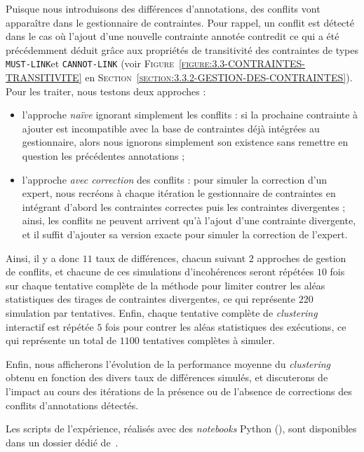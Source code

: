 			Puisque nous introduisons des différences d'annotations, des conflits vont apparaître dans le gestionnaire de contraintes.
			Pour rappel, un conflit est détecté dans le cas où l'ajout d'une nouvelle contrainte annotée contredit ce qui a été précédemment déduit grâce aux propriétés de transitivité des contraintes de types \texttt{MUST-LINK}et \texttt{CANNOT-LINK} (voir \textsc{Figure~\ref{figure:3.3-CONTRAINTES-TRANSITIVITE}} en \textsc{Section~\ref{section:3.3.2-GESTION-DES-CONTRAINTES}}).
			Pour les traiter, nous testons deux approches :
			\begin{itemize}
				\item l'approche \textit{naïve} ignorant simplement les conflits : si la prochaine contrainte à ajouter est incompatible avec la base de contraintes déjà intégrées au gestionnaire, alors nous ignorons simplement son existence sans remettre en question les précédentes annotations ;
				\item l'approche \textit{avec correction} des conflits : pour simuler la correction d'un expert, nous recréons à chaque itération le gestionnaire de contraintes en intégrant d'abord les contraintes correctes puis les contraintes divergentes ; ainsi, les conflits ne peuvent arrivent qu'à l'ajout d'une contrainte divergente, et il suffit d'ajouter sa version exacte pour simuler la correction de l'expert.
			\end{itemize}
			
			Ainsi, il y a donc $11$ taux de différences, chacun suivant $2$ approches de gestion de conflits, et chacune de ces simulations d'incohérences seront répétées $10$ fois sur chaque tentative complète de la méthode pour limiter contrer les aléas statistiques des tirages de contraintes divergentes, ce qui représente $220$ simulation par tentatives.
			Enfin, chaque tentative complète de \textit{clustering} interactif est répétée $5$ fois pour contrer les aléas statistiques des exécutions, ce qui représente un total de $1100$ tentatives complètes à simuler.

			Enfin, nous afficherons l'évolution de la performance moyenne du \textit{clustering} obtenu en fonction des divers taux de différences simulés, et discuterons de l'impact au cours des itérations de la présence ou de l'absence de corrections des conflits d'annotations détectés.
			
			\begin{leftBarInformation}
				Les scripts de l'expérience, réalisés avec des \textit{notebooks} Python (\cite{van-rossum-drake:2009:python-reference-manual}), sont disponibles dans un dossier dédié de~\cite{schild:2021:cognitivefactory-interactiveclusteringcomparativestudy}.
			\end{leftBarInformation}


